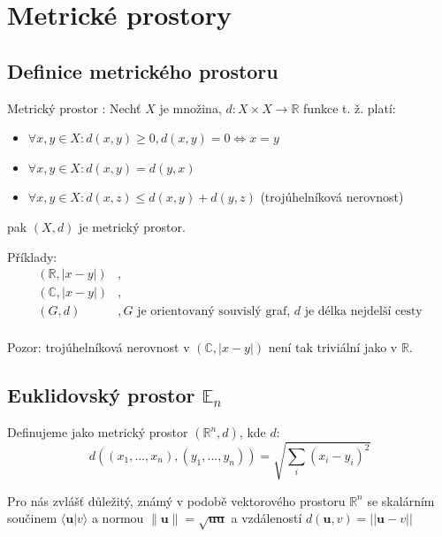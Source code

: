 \documentclass[../main.tex]{subfiles}
\begin{document}
\section{Metrické prostory}
\subsection{Definice metrického prostoru}
\hspace{1.2mm}
Metrický prostor : Nechť $X$ je množina,  $d: X \times X \rightarrow \mathbb{R}$ funkce t. ž. platí:

\begin{itemize}
\item{$\forall x,y \in X : d(x,y) \geq 0, d(x,y) = 0 \iff x = y$ }
\item{$\forall x,y \in X : d(x,y) = d(y,x)$}
\item{$\forall x,y \in X : d(x,z) \leq d(x,y) + d(y,z)$ (trojúhelníková nerovnost)}
\end{itemize}
pak $(X,d)$ je metrický prostor.

\noindent
\hspace{1.2mm}
Příklady:
\begin{align*} 
    (\mathbb{R}, |x-y|) &,\\
    (\mathbb{C},|x-y|) &,\\
    (G,d) &, G \text{ je orientovaný souvislý graf, } d \text{ je délka nejdelší cesty}\\
\end{align*}

\hspace{1.2mm}
Pozor: trojúhelníková nerovnost v $(\mathbb{C}, |x-y|)$ není tak triviální jako v $\mathbb{R}$.

\subsection{Euklidovský prostor $\mathbb{E}_n$}
\hspace{1.2mm}
Definujeme jako metrický prostor $(\mathbb{R}^n,d)$, kde $d$:
\[d((x_1,...,x_n),(y_1,...,y_n)) = \sqrt{\sum_i(x_i-y_i)^2}\]

Pro nás zvlášť důležitý, známý v podobě vektorového prostoru $\mathbb{R}^n$ se skalárním součinem $\langle \textbf{u} | v \rangle$ a normou
$\|\textbf{u}\| = \sqrt{\textbf{uu}}$ a vzdáleností $d(\textbf{u},v) = ||\textbf{u}-v||$
\noindent
\end{document}
